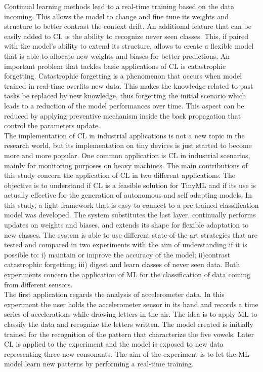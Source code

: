 \documentclass[12pt]{report}
\begin{document}
Continual learning methods lead to a real-time training based on the data incoming. This allows the model to change and fine tune its weights and structure to better contrast the context drift.
An additional feature that can be easily added to CL is the ability to recognize never seen classes. This, if paired with the model's ability to extend its structure, allows to create a flexible model that is able to allocate new weights and biases for better predictions.
An important problem that tackles basic applications of CL is catastrophic forgetting. Catastrophic forgetting is a phenomenon that occurs when model trained in real-time overfits new data. This makes the knowledge related to past tasks be replaced by new knowledge, thus forgetting the initial scenario which leads to a reduction of the model performances over time. This aspect can be reduced by applying preventive mechanism inside the back propagation that control the parameters update. \\
The implementation of CL in industrial applications is not a new topic in the research world, but its implementation on tiny devices is just started to become more and more popular. One common application is CL in industrial scenarios, mainly for monitoring purposes on heavy machines.
The main contributions of this study concern the application of CL in two different applications. The objective is to understand if CL is a feasible solution for TinyML and if its use is actually effective for the generation of autonomous and self adapting models. In this study, a light framework that is easy to connect to a pre trained classification model was developed. The system substitutes the last layer, continually performs updates on weights and biases, and extends its shape for flexible adaptation to new classes. The system is able to use different state-of-the-art strategies that are tested and compared in two experiments with the aim of understanding if it is possible to: i) maintain or improve the accuracy of the model; ii)contrast catastrophic forgetting; iii) digest and learn classes of never seen data. Both experiments concern the application of ML for the classification of data coming from different sensors. \\
The first application regards the analysis of accelerometer data. In this experiment the user holds the accelerometer sensor in its hand and records a time series of accelerations while drawing letters in the air. The idea is to apply ML to classify the data and recognize the letters written. The model created is initially trained for the recognition of the pattern that characterize the five vowels. Later CL is applied to the experiment and the model is exposed to new data representing three new consonants. The aim of the experiment is to let the ML model learn new patterns by performing a real-time training.
\end{document}
